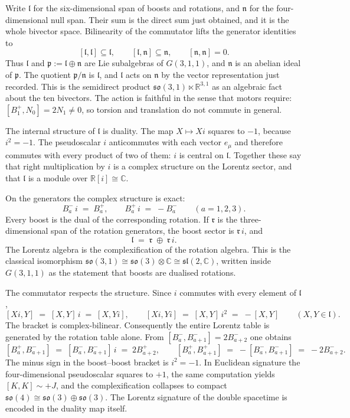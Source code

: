 \documentclass[a4paper]{article}
\begin{document}
Write \(\mathfrak{l}\) for the six-dimensional span of boosts and rotations, and \(\mathfrak{n}\) for the four-dimensional null span. Their sum is the direct sum just obtained, and it is the whole bivector space. Bilinearity of the commutator lifts the generator identities to
\[
[\mathfrak{l},\mathfrak{l}]\subseteq\mathfrak{l},\qquad
[\mathfrak{l},\mathfrak{n}]\subseteq\mathfrak{n},\qquad
[\mathfrak{n},\mathfrak{n}]=0.
\]
Thus \(\mathfrak{l}\) and \(\mathfrak{p}:=\mathfrak{l}\oplus\mathfrak{n}\) are Lie subalgebras of \(G(3,1,1)\), and \(\mathfrak{n}\) is an abelian ideal of \(\mathfrak{p}\). The quotient \(\mathfrak{p}/\mathfrak{n}\) is \(\mathfrak{l}\), and \(\mathfrak{l}\) acts on \(\mathfrak{n}\) by the vector representation just recorded. This is the semidirect product \(\mathfrak{so}(3,1)\ltimes\mathbb{R}^{3,1}\) as an algebraic fact about the ten bivectors. The action is faithful in the sense that motors require: \([B^{+}_{1},N_{0}]=2N_{1}\neq 0\), so torsion and translation do not commute in general.

The internal structure of \(\mathfrak{l}\) is duality. The map \(X\mapsto Xi\) squares to \(-1\), because \(i^{2}=-1\). The pseudoscalar \(i\) anticommutes with each vector \(e_{\mu}\) and therefore commutes with every product of two of them: \(i\) is central on \(\mathfrak{l}\). Together these say that right multiplication by \(i\) is a complex structure on the Lorentz sector, and that \(\mathfrak{l}\) is a module over \(\mathbb{R}[i]\cong\mathbb{C}\).

On the generators the complex structure is exact:
\[
B^{-}_{a}\,i \;=\; B^{+}_{a},\qquad
B^{+}_{a}\,i \;=\; -B^{-}_{a}\qquad(a=1,2,3).
\]
Every boost is the dual of the corresponding rotation. If \(\mathfrak{r}\) is the three-dimensional span of the rotation generators, the boost sector is \(\mathfrak{r}\,i\), and
\[
\mathfrak{l} \;=\; \mathfrak{r}\;\oplus\;\mathfrak{r}\,i.
\]
The Lorentz algebra is the complexification of the rotation algebra. This is the classical isomorphism \(\mathfrak{so}(3,1)\cong\mathfrak{so}(3)\otimes\mathbb{C}\cong\mathfrak{sl}(2,\mathbb{C})\), written inside \(G(3,1,1)\) as the statement that boosts are dualised rotations.

The commutator respects the structure. Since \(i\) commutes with every element of \(\mathfrak{l}\),
\[
[Xi,Y] \;=\; [X,Y]\,i \;=\; [X,Yi],\qquad
[Xi,Yi] \;=\; [X,Y]\,i^{2} \;=\; -[X,Y]
\qquad(X,Y\in\mathfrak{l}).
\]
The bracket is complex-bilinear. Consequently the entire Lorentz table is generated by the rotation table alone. From \([B^{-}_{a},B^{-}_{a+1}]=2B^{-}_{a+2}\) one obtains
\[
[B^{+}_{a},B^{-}_{a+1}] \;=\; [B^{-}_{a},B^{-}_{a+1}]\,i \;=\; 2B^{+}_{a+2},
\qquad
[B^{+}_{a},B^{+}_{a+1}] \;=\; -[B^{-}_{a},B^{-}_{a+1}] \;=\; -2B^{-}_{a+2}.
\]
The minus sign in the boost--boost bracket is \(i^{2}=-1\). In Euclidean signature the four-dimensional pseudoscalar squares to \(+1\), the same computation yields \([K,K]\sim +J\), and the complexification collapses to compact \(\mathfrak{so}(4)\cong\mathfrak{so}(3)\oplus\mathfrak{so}(3)\). The Lorentz signature of the double spacetime is encoded in the duality map itself.
\end{document}
